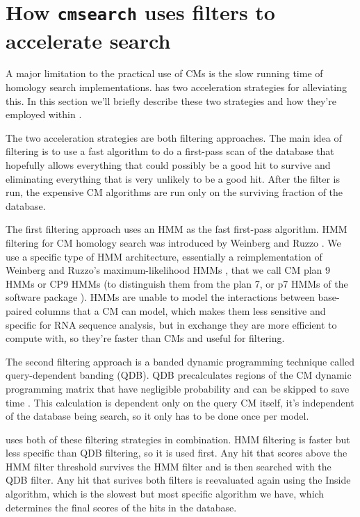 \section{How \texttt{cmsearch} uses filters to accelerate search}

A major limitation to the practical use of CMs is the slow running
time of homology search implementations.  has two
acceleration strategies for alleviating this. In this section we'll
briefly describe these two strategies and how they're employed within
.

The two acceleration strategies are both filtering approaches.  The
main idea of filtering is to use a fast algorithm to do a first-pass
scan of the database that hopefully allows everything that
could possibly be a good hit to survive and eliminating everything
that is very unlikely to be a good hit. After the filter is run, the
expensive CM algorithms are run only on the surviving fraction of the
database.

The first filtering approach uses an HMM as the fast first-pass
algorithm. HMM filtering for CM homology search was introduced by
Weinberg and Ruzzo
\cite{WeinbergRuzzo04,WeinbergRuzzo04b,WeinbergRuzzo06}. We use a
specific type of HMM architecture, essentially a reimplementation of
Weinberg and Ruzzo's maximum-likelihood HMMs \cite{WeinbergRuzzo06},
that we call CM plan 9 HMMs or CP9 HMMs (to distinguish them from the
plan 7, or p7 HMMs of the  software package
). HMMs
are unable to model the interactions between base-paired columns that
a CM can model, which makes them less sensitive and specific for RNA
sequence analysis, but in exchange they are more efficient to compute
with, so they're faster than CMs and useful for filtering.

The second filtering approach is a banded dynamic programming
technique called query-dependent banding (QDB). QDB precalculates
regions of the CM dynamic programming matrix that have negligible
probability and can be skipped to save time
\cite{NawrockiEddy07}. This calculation is dependent only on the query
CM itself, it's independent of the database being search, so it only
has to be done once per model. 

 uses both of these filtering strategies in
combination. HMM filtering is faster but less specific than QDB
filtering, so it is used first. Any hit that scores above the HMM
filter threshold survives the HMM filter and is then searched with the
QDB filter. Any hit that surives both filters is reevaluated again
using the Inside algorithm, which is the slowest but most specific
algorithm we have, which determines the final scores of the hits in
the database.

